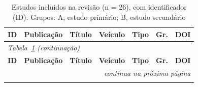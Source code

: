 \begingroup
\scriptsize
\SingleSpacing
\setlength{\tabcolsep}{2.5pt}
\renewcommand{\arraystretch}{1.0}
\begin{longtable}{|l|>{\raggedright\arraybackslash}p{2.4cm}|>{\raggedright\arraybackslash}p{5.0cm}|>{\raggedright\arraybackslash}p{2.6cm}|l|l|>{\raggedright\arraybackslash}p{2.5cm}|}
	\caption[Estudos inclu\'idos na revis\~ao, com identificador (ID)]{Estudos inclu\'idos na revis\~ao (n = 26), com identificador (ID). Grupos: A, estudo prim\'ario; B, estudo secund\'ario}\label{tab:estudos-incluidos}                                                                                                                                                                                                                     \\ \hline
	\textbf{ID}                   & \textbf{Publicação}                & \textbf{T\'itulo}                                                                                                                                                                                                   & \textbf{Ve\'iculo}                                                                                 & \textbf{Tipo} & \textbf{Gr.} & \textbf{DOI}                                                                                            \\ \hline
	\endfirsthead
	\multicolumn{7}{l}{\scriptsize\textit{Tabela~\ref{tab:estudos-incluidos} (continua\c{c}\~ao)}}                                                                                                                                                                                                                                                                                                                                                                                                                                         \\ \hline
	\textbf{ID}                   & \textbf{Publicação}                & \textbf{T\'itulo}                                                                                                                                                                                                   & \textbf{Ve\'iculo}                                                                                 & \textbf{Tipo} & \textbf{Gr.} & \textbf{DOI}                                                                                            \\ \hline
	\endhead

	\multicolumn{7}{r}{\scriptsize\textit{continua na pr\'oxima p\'agina}}                                                                                                                                                                                                                                                                                                                                                                                                                                                                 \\
	\endfoot


\end{longtable}
